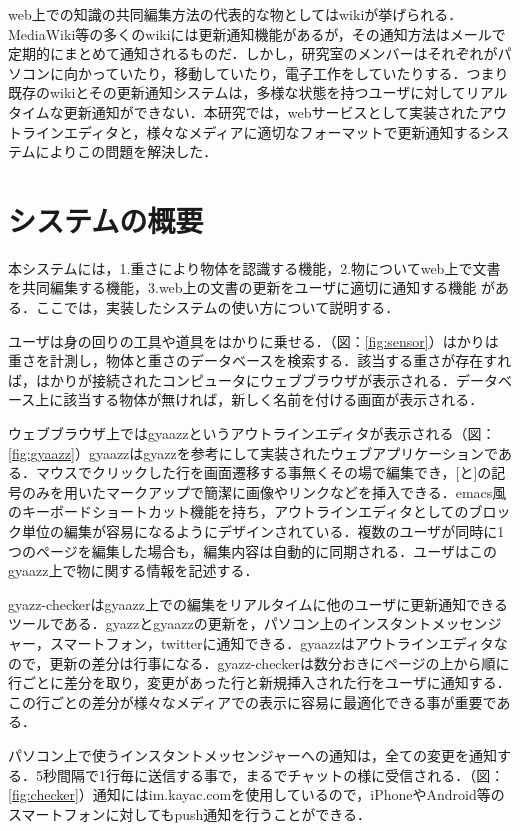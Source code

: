 web上での知識の共同編集方法の代表的な物としてはwikiが挙げられる．MediaWiki\cite{mediawiki}等の多くのwikiには更新通知機能があるが，その通知方法はメールで定期的にまとめて通知されるものだ．しかし，研究室のメンバーはそれぞれがパソコンに向かっていたり，移動していたり，電子工作をしていたりする．つまり既存のwikiとその更新通知システムは，多様な状態を持つユーザに対してリアルタイムな更新通知ができない．本研究では，webサービスとして実装されたアウトラインエディタと，様々なメディアに適切なフォーマットで更新通知するシステムによりこの問題を解決した．


\section{システムの概要}
本システムには，1.重さにより物体を認識する機能，2.物についてweb上で文書を共同編集する機能，3.web上の文書の更新をユーザに適切に通知する機能 がある．ここでは，実装したシステムの使い方について説明する．

ユーザは身の回りの工具や道具をはかりに乗せる．（図：\ref{fig:sensor}）はかりは重さを計測し，物体と重さのデータベースを検索する．該当する重さが存在すれば，はかりが接続されたコンピュータにウェブブラウザが表示される．データベース上に該当する物体が無ければ，新しく名前を付ける画面が表示される．

ウェブブラウザ上ではgyaazzというアウトラインエディタが表示される（図：\ref{fig:gyaazz}）gyaazzはgyazz\cite{gyazz}を参考にして実装されたウェブアプリケーションである．マウスでクリックした行を画面遷移する事無くその場で編集でき，[と]の記号のみを用いたマークアップで簡潔に画像やリンクなどを挿入できる．emacs風のキーボードショートカット機能を持ち，アウトラインエディタとしてのブロック単位の編集が容易になるようにデザインされている．複数のユーザが同時に1つのページを編集した場合も，編集内容は自動的に同期される．ユーザはこのgyaazz上で物に関する情報を記述する．

gyazz-checkerはgyaazz上での編集をリアルタイムに他のユーザに更新通知できるツールである．gyazzとgyaazzの更新を，パソコン上のインスタントメッセンジャー，スマートフォン，twitterに通知できる．gyaazzはアウトラインエディタなので，更新の差分は行事になる．gyazz-checkerは数分おきにページの上から順に行ごとに差分を取り，変更があった行と新規挿入された行をユーザに通知する．この行ごとの差分が様々なメディアでの表示に容易に最適化できる事が重要である．

パソコン上で使うインスタントメッセンジャーへの通知は，全ての変更を通知する．5秒間隔で1行毎に送信する事で，まるでチャットの様に受信される．（図：\ref{fig:checker}）通知にはim.kayac.com\cite{imkayac}を使用しているので，iPhoneやAndroid等のスマートフォンに対してもpush通知を行うことができる．

